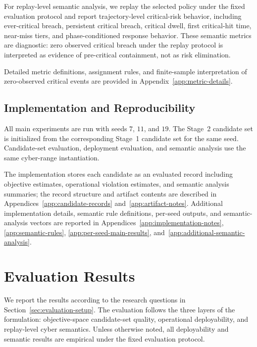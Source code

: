 \documentclass[sigconf,review,anonymous]{acmart}
\begin{document}
For replay-level semantic analysis, we replay the selected policy under
the fixed evaluation protocol and report trajectory-level critical-risk
behavior, including ever-critical breach, persistent critical breach,
critical dwell, first critical-hit time, near-miss tiers, and
phase-conditioned response behavior. These semantic metrics are
diagnostic: zero observed critical breach under the replay protocol is
interpreted as evidence of pre-critical containment, not as risk
elimination.

Detailed metric definitions, assignment rules, and finite-sample
interpretation of zero-observed critical events are provided in
Appendix~\ref{app:metric-details}.

\subsection{Implementation and Reproducibility}
\label{subsec:eval-reproducibility}

All main experiments are run with seeds \(7\), \(11\), and \(19\). The
Stage~2 candidate set is initialized from the corresponding Stage~1
candidate set for the same seed. Candidate-set evaluation, deployment
evaluation, and semantic analysis use the same cyber-range
instantiation.

The implementation stores each candidate as an evaluated record including
objective estimates, operational violation estimates, and semantic
analysis summaries; the record structure and artifact contents are
described in Appendices~\ref{app:candidate-records}
and~\ref{app:artifact-notes}. Additional implementation details,
semantic rule definitions, per-seed outputs, and semantic-analysis
vectors are reported in Appendices~\ref{app:implementation-notes},
\ref{app:semantic-rules}, \ref{app:per-seed-main-results},
and~\ref{app:additional-semantic-analysis}.


\section{Evaluation Results}
\label{sec:evaluation-results}

We report the results according to the research questions in
Section~\ref{sec:evaluation-setup}. The evaluation follows the three
layers of the formulation: objective-space candidate-set quality,
operational deployability, and replay-level cyber semantics. Unless
otherwise noted, all deployability and semantic results are empirical
under the fixed evaluation protocol.
\end{document}
